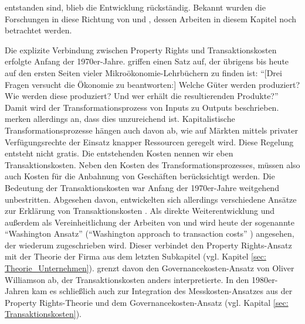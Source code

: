 entstanden sind, blieb die Entwicklung rückständig. Bekannt wurden die Forschungen in diese Richtung von \textcite{Soto2000} und \textcite{Acemoglu2012}, dessen Arbeiten in diesem Kapitel noch betrachtet werden.

Die explizite Verbindung zwischen Property Rights und Transaktionskosten erfolgte Anfang der 1970er-Jahre. \textcite{Alchian1973} griffen einen Satz auf, der übrigens bis heute auf den ersten Seiten vieler Mikroökonomie-Lehrbüchern zu finden ist: "`[Drei Fragen versucht die Ökonomie zu beantworten:] Welche Güter werden produziert? Wie werden diese produziert? Und wer erhält die resultierenden Produkte?"' Damit wird der Transformationsprozess von Inputs zu Outputs beschrieben. \textcite[S. 16]{Alchian1973} merken allerdings an, dass dies unzureichend ist. Kapitalistische Transformationsprozesse hängen auch davon ab, wie auf Märkten mittels privater Verfügungsrechte der Einsatz knapper Ressourcen geregelt wird. Diese Regelung entsteht nicht gratis. Die entstehenden Kosten nennen wir eben Transaktionskosten. Neben den Kosten des Transformationsprozesses, müssen also auch Kosten für die Anbahnung von Geschäften berücksichtigt werden. Die Bedeutung der Transaktionskosten war Anfang der 1970er-Jahre weitgehend unbestritten. Abgesehen davon, entwickelten sich allerdings verschiedene Ansätze zur Erklärung von Transaktionskosten \parencite[S. 33]{North1990}. Als direkte Weiterentwicklung und außerdem als Vereinheitlichung \parencite{Allen2022} der Arbeiten von \textcite{Coase1960} und \textcite{Alchian1965, Demsetz1967, Alchian1973} wird heute der sogenannte "`Washington Ansatz"' ("`Washington approach to transaction costs"' \parencite[S. 4]{Allen2024}) angesehen, der wiederum \textcite{Cheung1974, Cheung1983} zugeschrieben wird. Dieser verbindet den Property Rights-Ansatz mit der Theorie der Firma aus dem letzten Subkapitel (vgl. Kapitel \ref{sec: Theorie_Unternehmen}). \textcite{North1990} grenzt davon den Governancekosten-Ansatz von Oliver Williamson ab, der Transaktionskosten anders interpretierte. In den 1980er-Jahren kam es schließlich auch zur Integration des Messkosten-Ansatzes aus der Property Rights-Theorie und dem Governancekosten-Ansatz (vgl. Kapital \ref{sec: Transaktionskosten}).

